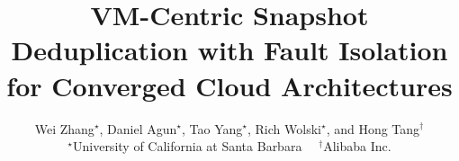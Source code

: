 \documentclass[letterpaper,twocolumn,10pt]{article}
\begin{document}
\title{
VM-Centric  Snapshot Deduplication  with Fault Isolation 
for Converged Cloud Architectures} 
\author{
  Wei Zhang$^{\star}$, Daniel Agun$^\star$, Tao Yang$^\star$, Rich Wolski$^{\star}$, and  Hong Tang$^\dagger$\\
  {\normalsize$^\star$University of California at Santa Barbara} \ \ {\normalsize$^\dagger$Alibaba Inc.} \\
}

\maketitle









\appendix


\begin{small}


\end{small}
\end{document}
